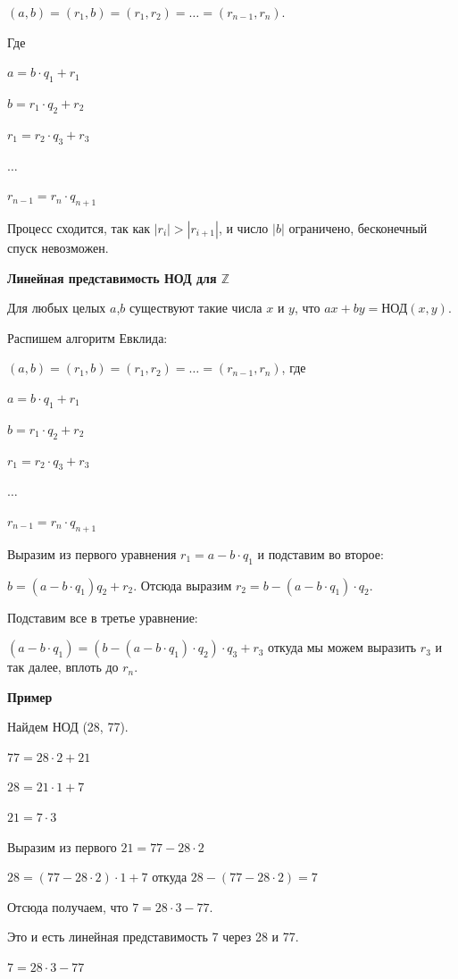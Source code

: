 $(a,b)=(r_1,b)=(r_1,r_2)=\ldots=(r_{n-1},r_n)$.

\newpage

\hspace{3mm}

Где

$a=b\cdot q_1+r_1$

$b=r_1 \cdot q_2 + r_2$

$r_1=r_2 \cdot q_3 + r_3$

$\ldots$

$r_{n-1}=r_n \cdot q_{n+1} $

Процесс сходится, так как $|r_i| > |r_{i+1}|$, и число $|b|$ ограничено, бесконечный спуск невозможен.

\textbf{Линейная представимость НОД для $\mathbb{Z}$}

Для любых целых $a$,$b$ существуют такие числа $x$ и $y$, что $ax+by=\text{НОД}(x,y)$.

Распишем алгоритм Евклида:

$(a,b)=(r_1,b)=(r_1,r_2)=\ldots=(r_{n-1},r_n)$, где 

$a=b\cdot q_1+r_1$

$b=r_1 \cdot q_2 + r_2$

$r_1=r_2 \cdot q_3 + r_3$

$\ldots$

$r_{n-1}=r_n \cdot q_{n+1} $


Выразим из первого уравнения $r_1=a-b\cdot q_1$ и подставим во второе:

$b=(a-b \cdot q_1) q_2 + r_2$. Отсюда выразим $r_2=b-(a-b\cdot q_1) \cdot q_2$.

Подставим все в третье уравнение:

$(a-b\cdot q_1)=(b-(a-b\cdot q_1) \cdot q_2) \cdot q_3 + r_3$ откуда мы можем выразить $r_3$ и так далее, вплоть до $r_n$. 


{\bf Пример}

Найдем НОД (28, 77).

$77=28\cdot2 +21$

$28=21 \cdot 1 +7$

$21=7 \cdot 3$

Выразим из первого $21=77-28\cdot2$

$28=(77-28\cdot2)\cdot 1+7$ откуда $28-(77-28\cdot 2)=7$

Отсюда получаем, что $7=28\cdot 3 - 77$.

Это и есть линейная представимость 7 через 28 и 77. 

$7=28\cdot 3 - 77$

